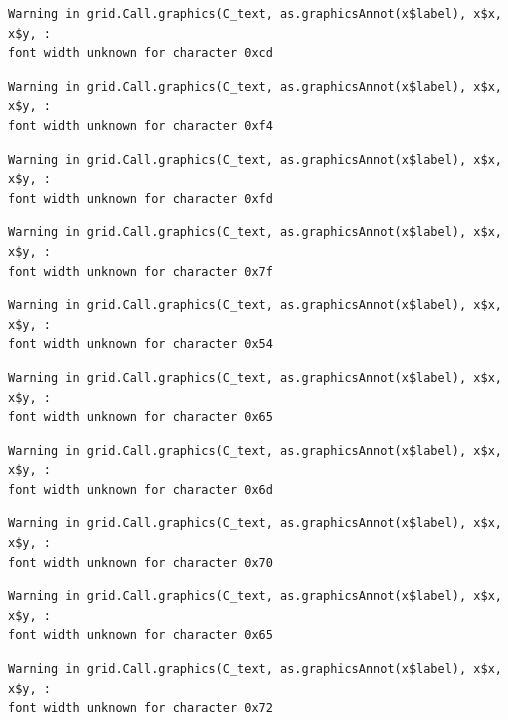 \documentclass[
  letterpaper,
  DIV=11,
  numbers=noendperiod]{scrreprt}
\begin{document}
\begin{verbatim}
Warning in grid.Call.graphics(C_text, as.graphicsAnnot(x$label), x$x, x$y, :
font width unknown for character 0xcd
\end{verbatim}

\begin{verbatim}
Warning in grid.Call.graphics(C_text, as.graphicsAnnot(x$label), x$x, x$y, :
font width unknown for character 0xf4
\end{verbatim}

\begin{verbatim}
Warning in grid.Call.graphics(C_text, as.graphicsAnnot(x$label), x$x, x$y, :
font width unknown for character 0xfd
\end{verbatim}

\begin{verbatim}
Warning in grid.Call.graphics(C_text, as.graphicsAnnot(x$label), x$x, x$y, :
font width unknown for character 0x7f
\end{verbatim}

\begin{verbatim}
Warning in grid.Call.graphics(C_text, as.graphicsAnnot(x$label), x$x, x$y, :
font width unknown for character 0x54
\end{verbatim}

\begin{verbatim}
Warning in grid.Call.graphics(C_text, as.graphicsAnnot(x$label), x$x, x$y, :
font width unknown for character 0x65
\end{verbatim}

\begin{verbatim}
Warning in grid.Call.graphics(C_text, as.graphicsAnnot(x$label), x$x, x$y, :
font width unknown for character 0x6d
\end{verbatim}

\begin{verbatim}
Warning in grid.Call.graphics(C_text, as.graphicsAnnot(x$label), x$x, x$y, :
font width unknown for character 0x70
\end{verbatim}

\begin{verbatim}
Warning in grid.Call.graphics(C_text, as.graphicsAnnot(x$label), x$x, x$y, :
font width unknown for character 0x65
\end{verbatim}

\begin{verbatim}
Warning in grid.Call.graphics(C_text, as.graphicsAnnot(x$label), x$x, x$y, :
font width unknown for character 0x72
\end{verbatim}
\end{document}

